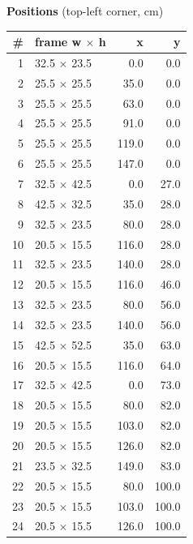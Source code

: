 \documentclass[a4paper,landscape,10pt]{article}
\begin{document}
\begin{minipage}[t]{0.25\textwidth}
\vspace{8pt}
{\bfseries Positions} (top-left corner, cm)\\[2pt]
\tiny
\begin{tabular}{@{}r l r r@{}}
\toprule
\# & frame w $\times$ h & x & y \\
\midrule
1 & 32.5 $\times$ 23.5 & 0.0 & 0.0 \\
2 & 25.5 $\times$ 25.5 & 35.0 & 0.0 \\
3 & 25.5 $\times$ 25.5 & 63.0 & 0.0 \\
4 & 25.5 $\times$ 25.5 & 91.0 & 0.0 \\
5 & 25.5 $\times$ 25.5 & 119.0 & 0.0 \\
6 & 25.5 $\times$ 25.5 & 147.0 & 0.0 \\
7 & 32.5 $\times$ 42.5 & 0.0 & 27.0 \\
8 & 42.5 $\times$ 32.5 & 35.0 & 28.0 \\
9 & 32.5 $\times$ 23.5 & 80.0 & 28.0 \\
10 & 20.5 $\times$ 15.5 & 116.0 & 28.0 \\
11 & 32.5 $\times$ 23.5 & 140.0 & 28.0 \\
12 & 20.5 $\times$ 15.5 & 116.0 & 46.0 \\
13 & 32.5 $\times$ 23.5 & 80.0 & 56.0 \\
14 & 32.5 $\times$ 23.5 & 140.0 & 56.0 \\
15 & 42.5 $\times$ 52.5 & 35.0 & 63.0 \\
16 & 20.5 $\times$ 15.5 & 116.0 & 64.0 \\
17 & 32.5 $\times$ 42.5 & 0.0 & 73.0 \\
18 & 20.5 $\times$ 15.5 & 80.0 & 82.0 \\
19 & 20.5 $\times$ 15.5 & 103.0 & 82.0 \\
20 & 20.5 $\times$ 15.5 & 126.0 & 82.0 \\
21 & 23.5 $\times$ 32.5 & 149.0 & 83.0 \\
22 & 20.5 $\times$ 15.5 & 80.0 & 100.0 \\
23 & 20.5 $\times$ 15.5 & 103.0 & 100.0 \\
24 & 20.5 $\times$ 15.5 & 126.0 & 100.0 \\
\bottomrule
\end{tabular}
\end{minipage}
\clearpage
\end{document}
